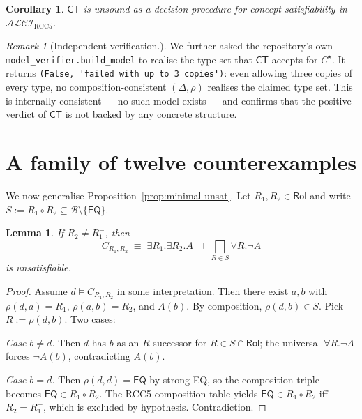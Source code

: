 \documentclass[]{ceurart}
\newcommand{\ALCI}{\mathcal{ALCI}}
\newcommand{\ALCIRCC}[1]{\ALCI_{\mathrm{RCC}#1}}
\newcommand{\EQ}{\mathsf{EQ}}
\newcommand{\comp}{\circ}
\newcommand{\inv}[1]{#1^{-}}
\newtheorem{lemma}[theorem]{Lemma}
\newtheorem{corollary}[theorem]{Corollary}
\theoremstyle{definition}
\theoremstyle{remark}
\newtheorem{remark}[theorem]{Remark}
\begin{document}
\begin{corollary}
  \label{cor:unsound}
  $\mathsf{CT}$ is unsound as a decision procedure for concept
  satisfiability in $\ALCIRCC{5}$.
\end{corollary}

\begin{remark}[Independent verification.]
  We further asked the repository's own
  \verb|model_verifier.build_model| to realise the type set that
  $\mathsf{CT}$ accepts for $C^{\star}$.  It returns
  \verb|(False, 'failed with up to 3 copies')|: even allowing three
  copies of every type, no composition-consistent
  $(\Delta, \rho)$ realises the claimed type set.  This is internally
  consistent --- no such model exists --- and confirms that the
  positive verdict of $\mathsf{CT}$ is not backed by any concrete
  structure.
\end{remark}

\section{A family of twelve counterexamples}
\label{sec:family}

We now generalise Proposition~\ref{prop:minimal-unsat}. Let
$R_1, R_2 \in \mathsf{Rol}$ and write $S := R_1 \comp R_2 \subseteq
\mathcal{B} \setminus \{\EQ\}$.

\begin{lemma}
  \label{lem:generic-unsat}
  If $R_2 \neq \inv{R_1}$, then
  \[
    C_{R_1, R_2} \;\equiv\; \exists R_1 . \exists R_2 . A
      \;\sqcap\; \bigsqcap_{R \in S} \forall R . \neg A
  \]
  is unsatisfiable.
\end{lemma}

\begin{proof}
  Assume $d \models C_{R_1, R_2}$ in some interpretation. Then there
  exist $a, b$ with $\rho(d, a) = R_1$, $\rho(a, b) = R_2$, and $A(b)$.
  By composition, $\rho(d, b) \in S$. Pick $R := \rho(d, b)$. Two
  cases:

  \emph{Case $b \neq d$.}  Then $d$ has $b$ as an $R$-successor for
  $R \in S \cap \mathsf{Rol}$; the universal $\forall R . \neg A$
  forces $\neg A(b)$, contradicting $A(b)$.

  \emph{Case $b = d$.}  Then $\rho(d, d) = \EQ$ by strong EQ, so the
  composition triple becomes $\EQ \in R_1 \comp R_2$. The RCC5
  composition table yields $\EQ \in R_1 \comp R_2$ iff
  $R_2 = \inv{R_1}$, which is excluded by hypothesis. Contradiction.
\end{proof}
\end{document}
